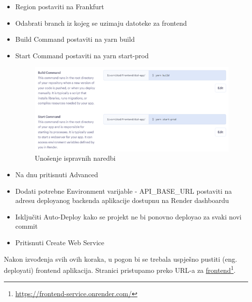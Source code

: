 \begin{itemize}
\begin{figure}[H]
    			\label{fig:fillDataFront}
    			\end{figure}
                    \item Region postaviti na Frankfurt
                    \item Odabrati branch iz kojeg se uzimaju datoteke za frontend
                    \item Build Command postaviti na yarn build
                    \item Start Command postaviti na yarn start-prod
                    \begin{figure}[H]
    			\includegraphics[]{slike/buildFront.png}
    			\centering
    			\caption{Unošenje ispravnih naredbi}
    			\label{fig:buildFrontCommands}
    			\end{figure}\textbf{}
                    \item Na dnu pritisnuti Advanced
                    \item Dodati potrebne Environment varijable - API\_BASE\_URL postaviti na adresu deployanog backenda aplikacije dostupnu na Render dashboardu
                    \item Isključiti Auto-Deploy kako se projekt ne bi ponovno deployao za svaki novi commit
                    \item Pritisnuti Create Web Service
                \end{itemize}

                Nakon izvođenja svih ovih koraka, u pogon bi se trebala uspješno pustiti (eng. deployati) frontend aplikacija. Stranici pristupamo preko URL-a za \underline{frontend}\footnote{\url{https://frontend-service.onrender.com/}}.